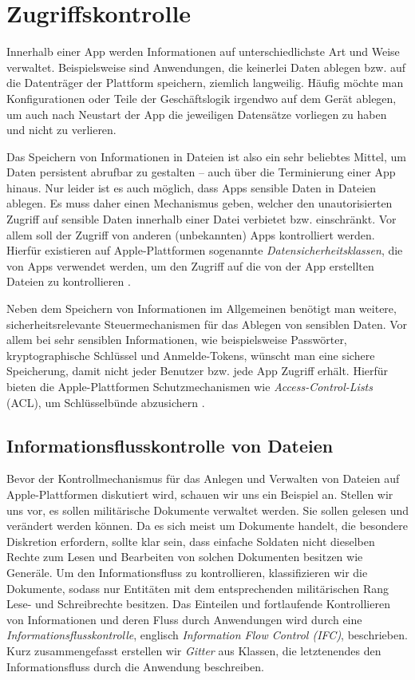 \section{Zugriffskontrolle}
Innerhalb einer App werden Informationen auf unterschiedlichste Art und Weise
verwaltet. Beispielsweise sind Anwendungen, die keinerlei Daten ablegen bzw. auf
die Datenträger der Plattform speichern, ziemlich langweilig. Häufig möchte man
Konfigurationen oder Teile der Geschäftslogik irgendwo auf dem Gerät ablegen, um
auch nach Neustart der App die jeweiligen Datensätze vorliegen zu haben und
nicht zu verlieren.

Das Speichern von Informationen in Dateien ist also ein sehr beliebtes Mittel,
um Daten persistent abrufbar zu gestalten -- auch über die Terminierung einer
App hinaus. Nur leider ist es auch möglich, dass Apps sensible Daten in Dateien
ablegen.  Es muss daher einen Mechanismus geben, welcher den unautorisierten
Zugriff auf sensible Daten innerhalb einer Datei verbietet bzw.  einschränkt.
Vor allem soll der Zugriff von anderen (unbekannten) Apps kontrolliert werden.
Hierfür existieren auf Apple-Plattformen sogenannte
\textit{Datensicherheitsklassen}, die von Apps verwendet werden, um den Zugriff
auf die von der App erstellten Dateien zu kontrollieren \cite[S. 50]{apple2020}.

Neben dem Speichern von Informationen im Allgemeinen benötigt man weitere,
sicherheitsrelevante Steuermechanismen für das Ablegen von sensiblen Daten. Vor
allem bei sehr sensiblen Informationen, wie beispielsweise Pass\-wör\-ter,
kryptographische Schlüssel und Anmelde-Tokens, wünscht man eine sichere
Speicherung, damit nicht jeder Benutzer bzw. jede App Zugriff erhält. Hierfür
bieten die Apple-Plattformen Schutzmechanismen wie \textit{Access-Control-Lists}
(ACL), um Schlüsselbünde abzusichern \cite[S. 55]{apple2020}.

\subsection{Informationsflusskontrolle von Dateien}
Bevor der Kontrollmechanismus für das Anlegen und Verwalten von Dateien auf
Apple-Plattformen diskutiert wird, schauen wir uns ein Beispiel an. Stellen wir
uns vor, es sollen militärische Dokumente verwaltet werden. Sie sollen gelesen
und verändert werden können. Da es sich meist um Dokumente handelt, die
besondere Diskretion erfordern, sollte klar sein, dass einfache Soldaten nicht
dieselben Rechte zum Lesen und Bearbeiten von solchen Dokumenten besitzen wie
Generäle. Um den Informationsfluss zu kontrollieren, klassifizieren wir die
Dokumente, sodass nur Entitäten mit dem entsprechenden militärischen Rang Lese-
und Schreibrechte besitzen. Das Einteilen und fortlaufende Kontrollieren von
Informationen und deren Fluss durch Anwendungen wird durch eine
\textit{Informationsflusskontrolle}, englisch \textit{Information Flow Control
(IFC)}, beschrieben. Kurz zusammengefasst erstellen wir \textit{Gitter} aus
Klassen, die letztenendes den Informationsfluss durch die Anwendung beschreiben.

